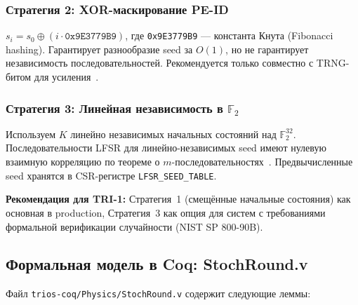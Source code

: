 \subsubsection{Стратегия 2: XOR-маскирование PE-ID}
\label{sssec:glava88-seed-xor}

$s_i = s_0 \oplus (i \cdot \texttt{0x9E3779B9})$,
где \texttt{0x9E3779B9} — константа Кнута (Fibonacci hashing).
Гарантирует разнообразие seed за $O(1)$, но не гарантирует
независимость последовательностей.  Рекомендуется только
совместно с TRNG-битом для усиления~\cite{gupta2015}.

\subsubsection{Стратегия 3: Линейная независимость в $\mathbb{F}_2$}
\label{sssec:glava88-seed-gf2}

Используем $K$ линейно независимых начальных состояний
над $\mathbb{F}_2^{32}$.  Последовательности LFSR для
линейно-независимых seed имеют нулевую взаимную корреляцию
по теореме о $m$-последовательностях~\cite{micikevicius2017mixed}.
Предвычисленные seed хранятся в CSR-регистре \texttt{LFSR\_SEED\_TABLE}.

\noindent\textbf{Рекомендация для TRI-1:} Стратегия~1
(смещённые начальные состояния) как основная в production,
Стратегия~3 как опция для систем с требованиями формальной
верификации случайности (NIST SP 800-90B).

\subsection{Формальная модель в Coq: StochRound.v}
\label{ssec:glava88-coq}

Файл \texttt{trios-coq/Physics/StochRound.v} содержит
следующие леммы:

